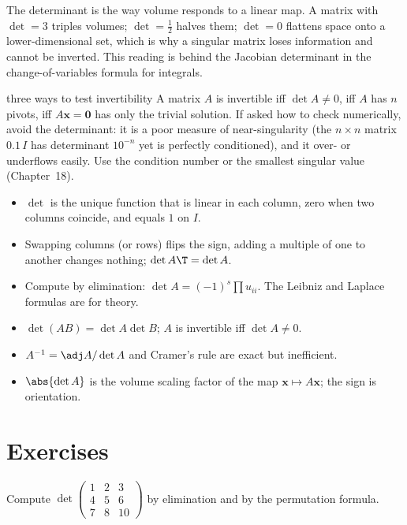\begin{intuition}
The determinant is the way volume responds to a linear map. A matrix with $\det=3$ triples volumes; $\det=\tfrac12$ halves them; $\det=0$ flattens space onto a lower-dimensional set, which is why a singular matrix loses information and cannot be inverted. This reading is behind the Jacobian determinant in the change-of-variables formula for integrals.
\end{intuition}

\begin{interview}{three ways to test invertibility}
A matrix $A$ is invertible iff $\det A\ne0$, iff $A$ has $n$ pivots, iff $A\mathbf{x}=\mathbf{0}$ has only the trivial solution. If asked how to check numerically, avoid the determinant: it is a poor measure of near-singularity (the $n\times n$ matrix $0.1\,I$ has determinant $10^{-n}$ yet is perfectly conditioned), and it over- or underflows easily. Use the condition number or the smallest singular value (Chapter~18).
\end{interview}

\begin{summarybox}
\begin{itemize}
  \item $\det$ is the unique function that is linear in each column, zero when two columns coincide, and equals $1$ on $I$.
  \item Swapping columns (or rows) flips the sign, adding a multiple of one to another changes nothing; $\det A\T=\det A$.
  \item Compute by elimination: $\det A=(-1)^s\prod u_{ii}$. The Leibniz and Laplace formulas are for theory.
  \item $\det(AB)=\det A\det B$; $A$ is invertible iff $\det A\ne0$.
  \item $A^{-1}=\adj A/\det A$ and Cramer's rule are exact but inefficient.
  \item $\abs{\det A}$ is the volume scaling factor of the map $\mathbf{x}\mapsto A\mathbf{x}$; the sign is orientation.
\end{itemize}
\end{summarybox}

\section{Exercises}

\begin{exercise}
Compute $\det\begin{pmatrix}1&2&3\\4&5&6\\7&8&10\end{pmatrix}$ by elimination and by the permutation formula.
\end{exercise}

